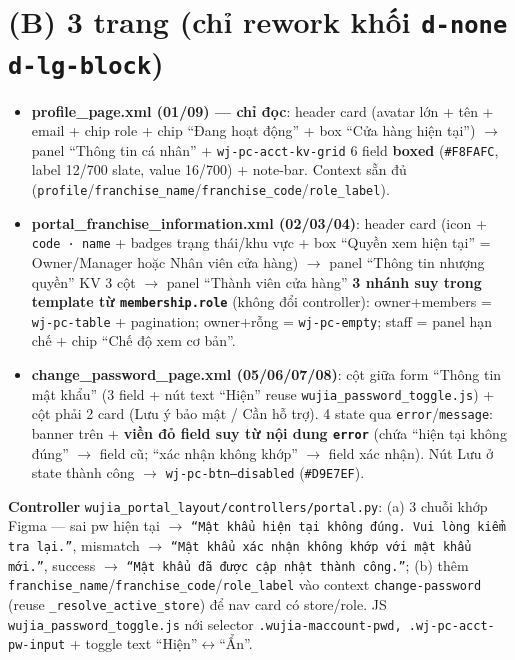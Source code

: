 \section{(B) 3 trang (chỉ rework khối \texttt{d-none d-lg-block})}

\begin{itemize}
  \item \textbf{profile\_page.xml (01/09) --- chỉ đọc}: header card (avatar lớn + tên + email + chip role + chip ``Đang hoạt động'' + box ``Cửa hàng hiện tại'') $\rightarrow$ panel ``Thông tin cá nhân'' + \texttt{wj-pc-acct-kv-grid} 6 field \textbf{boxed} (\texttt{\#F8FAFC}, label 12/700 slate, value 16/700) + note-bar. Context sẵn đủ (\texttt{profile}/\texttt{franchise\_name}/\texttt{franchise\_code}/\texttt{role\_label}).
  \item \textbf{portal\_franchise\_information.xml (02/03/04)}: header card (icon + \texttt{code · name} + badges trạng thái/khu vực + box ``Quyền xem hiện tại'' = Owner/Manager hoặc Nhân viên cửa hàng) $\rightarrow$ panel ``Thông tin nhượng quyền'' KV 3 cột $\rightarrow$ panel ``Thành viên cửa hàng'' \textbf{3 nhánh suy trong template từ \texttt{membership.role}} (không đổi controller): owner+members = \texttt{wj-pc-table} + pagination; owner+rỗng = \texttt{wj-pc-empty}; staff = panel hạn chế + chip ``Chế độ xem cơ bản''.
  \item \textbf{change\_password\_page.xml (05/06/07/08)}: cột giữa form ``Thông tin mật khẩu'' (3 field + nút text ``Hiện'' reuse \texttt{wujia\_password\_toggle.js}) + cột phải 2 card (Lưu ý bảo mật / Cần hỗ trợ). 4 state qua \texttt{error}/\texttt{message}: banner trên + \textbf{viền đỏ field suy từ nội dung \texttt{error}} (chứa ``hiện tại không đúng'' $\rightarrow$ field cũ; ``xác nhận không khớp'' $\rightarrow$ field xác nhận). Nút Lưu ở state thành công $\rightarrow$ \texttt{wj-pc-btn--disabled} (\texttt{\#D9E7EF}).
\end{itemize}

\textbf{Controller} \texttt{wujia\_portal\_layout/controllers/portal.py}: (a) 3 chuỗi khớp Figma --- sai pw hiện tại $\rightarrow$ \texttt{``Mật khẩu hiện tại không đúng. Vui lòng kiểm tra lại.''}, mismatch $\rightarrow$ \texttt{``Mật khẩu xác nhận không khớp với mật khẩu mới.''}, success $\rightarrow$ \texttt{``Mật khẩu đã được cập nhật thành công.''}; (b) thêm \texttt{franchise\_name}/\texttt{franchise\_code}/\texttt{role\_label} vào context \texttt{change-password} (reuse \texttt{\_resolve\_active\_store}) để nav card có store/role. JS \texttt{wujia\_password\_toggle.js} nới selector \texttt{.wujia-maccount-pwd, .wj-pc-acct-pw-input} + toggle text ``Hiện''$\leftrightarrow$``Ẩn''.

